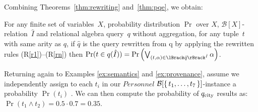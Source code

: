 Combining Theorems~\ref{thm:rewriting} and~\ref{thm:pqe}, we obtain:
\begin{corollary}
	\label{cor:pqe}
	For any finite set of variables~$X$, probability distribution $\Pr$
	over $X$, $\mathcal{B}[X]$-relation~$\hat I$
	and relational
	algebra query~$q$ without aggregation, for any tuple~$t$ with same
	arity as $q$, if $\hat q$ is the query rewritten from q by applying the
	rewritten rules (R\ref{r1})--(R\ref{rn}) then
	$\Pr(t\in q(\hat I))=\Pr\left(\bigvee_{(t,\alpha)\in \sem{\hat I}{\hat q}}\alpha\right)$.
\end{corollary}

\begin{example}\label{ex:probability}
	Returning again to Examples \ref{ex:semantics} and \ref{ex:provenance},
	assume we independently assign to each $t_i$ in our
	$\mathit{Personnel}$
	$\mathcal{B}[\left\{\,t_1,\dots,t_7\,\right\}]$-instance a probability $\Pr(t_i)$
  .
	We can then compute the probability of $q_{\mathrm{city}}$ results as:
			\(\Pr(t_1\land t_2) = 0.5\cdot0.7=0.35\).
\end{example}
